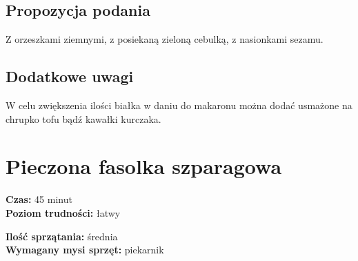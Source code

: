 \documentclass[a4paper,10pt]{book}
\begin{document}
\vspace{0.5cm}

\small \subsection*{Propozycja podania} Z orzeszkami ziemnymi, z posiekaną zieloną cebulką, z nasionkami sezamu.

\vspace{0.3cm}

\subsection*{Dodatkowe uwagi} W celu zwiększenia ilości białka w daniu do makaronu można dodać usmażone na chrupko tofu bądź kawałki kurczaka.

\newpage 

\section{Pieczona fasolka szparagowa}
\bigskip
\small
\begin{minipage}{0.45\textwidth}
    \noindent \textbf{Czas:} 45 minut \\
    \textbf{Poziom trudności:} łatwy
\end{minipage}
\begin{minipage}{0.45\textwidth}
    \noindent \textbf{Ilość sprzątania:} średnia\\
    \textbf{Wymagany mysi sprzęt:} piekarnik
\end{minipage}
\normalsize
\vspace{0.5cm}
\end{document}
